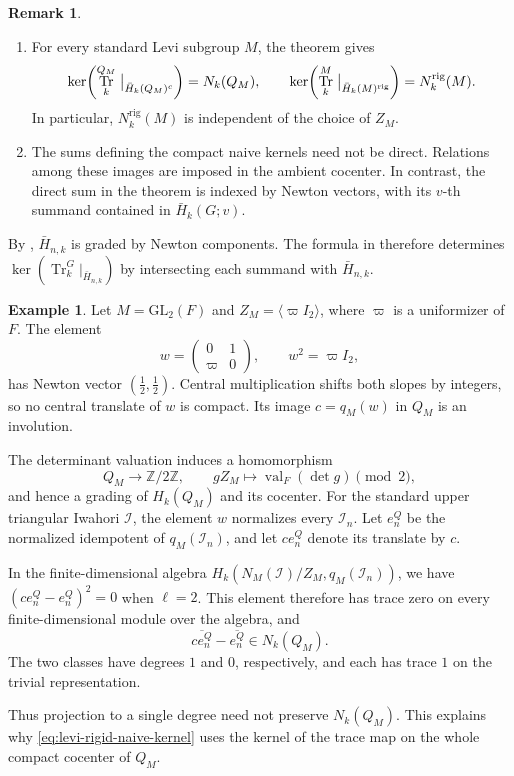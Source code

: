 \documentclass[11pt,letterpaper]{amsart}
\theoremstyle{definition}
\newtheorem{example}[theorem]{Example}
\newtheorem{remark}[theorem]{Remark}
\numberwithin{equation}{section}
\numberwithin{theorem}{section}
\newcommand{\kk}{k}
\newcommand{\ZZ}{\mathbb Z}
\newcommand{\CI}{\mathcal I}
\newcommand{\rig}{\mathrm{rig}}
\DeclareMathOperator{\Tr}{Tr}
\begin{document}
\begin{remark}
\begin{enumerate}
\item For every standard Levi subgroup $M$, the theorem gives
\[
 \ker\!\left(
   \Tr_\kk^{Q_M}\bigm|_{\bar H_\kk(Q_M)^c}
 \right)=N_\kk(Q_M),
 \qquad
 \ker\!\left(
   \Tr_\kk^M\bigm|_{\bar H_\kk(M)^{\rig}}
 \right)=N_\kk^{\rig}(M).
\]
In particular, $N_\kk^{\rig}(M)$ is independent of the
choice of $Z_M$.

\item The sums defining the compact naive kernels need not be direct. Relations among these images are imposed in the ambient cocenter. In contrast,
the direct sum in the theorem is indexed by Newton
vectors, with its $v$-th summand contained in
$\bar H_\kk(G;v)$.
\end{enumerate}
\end{remark}

By ,
$\bar H_{n,\kk}$ is graded by Newton components.
The formula in  therefore determines $\ker(\Tr_\kk^G|_{\bar H_{n,\kk}})$ by intersecting each summand with $\bar H_{n,\kk}$.

\begin{example}\label{ex:gl2-central-quotient}
Let $M=\mathrm{GL}_2(F)$ and
$Z_M=\langle\varpi I_2\rangle$, where $\varpi$ is a
uniformizer of $F$. The element
\[
 w=\begin{pmatrix}0&1\\ \varpi&0\end{pmatrix},
 \qquad w^2=\varpi I_2,
\]
has Newton vector $(\tfrac12,\tfrac12)$.
Central multiplication shifts both slopes by integers,
so no central translate of $w$ is compact.
Its image $c=q_M(w)$ in $Q_M$ is an involution.

The determinant valuation induces a homomorphism
\[
 Q_M\longrightarrow\ZZ/2\ZZ,
 \qquad
 gZ_M\longmapsto\operatorname{val}_F(\det g)\pmod2,
\]
and hence a grading of $H_\kk(Q_M)$ and its cocenter.
For the standard upper triangular Iwahori $\CI$, the
element $w$ normalizes every $\CI_n$.
Let $e_n^Q$ be the normalized idempotent of
$q_M(\CI_n)$, and let $ce_n^Q$ denote its translate by $c$.

In the finite-dimensional algebra $H_\kk(N_M(\CI)/Z_M,q_M(\CI_n))$, we have
$(ce_n^Q-e_n^Q)^2=0$ when $\ell=2$.
This element therefore has trace zero on every
finite-dimensional module over the algebra, and
\[
 \overline{ce_n^Q}-\overline{e_n^Q}\in N_\kk(Q_M).
\]
The two classes have degrees $1$ and $0$, respectively,
and each has trace $1$ on the trivial representation.

Thus projection to a single degree need not preserve $N_\kk(Q_M)$. This explains why \eqref{eq:levi-rigid-naive-kernel} uses the kernel of the trace map on the whole compact cocenter of $Q_M$.
\end{example}
\end{document}
